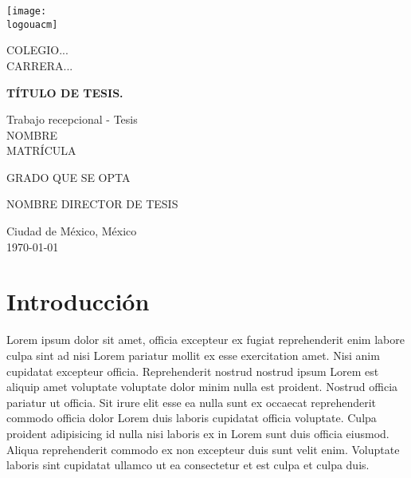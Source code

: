 \documentclass[12pt,twoside,left5mm,doublespacing]{bookest}
\newcommand{\logouacm}{logof.png} %
\begin{document}

\begin{titlepage}
	\centering

	\texttt{[image: \\logouacm]}
	\par\vspace{0.5cm}
	\large{COLEGIO...} \\
	\large{CARRERA...}
	\par\vspace{0.5cm}
	\Large\textbf{TÍTULO DE TESIS.} \\
	\par\vspace{0.5cm}
	\large{Trabajo recepcional - Tesis} \\
	\Large{NOMBRE} \\
	\large{MATRÍCULA}
	\par\vspace{0.5cm}
	\large{GRADO QUE SE OPTA} \\
	\par\vspace{0.5cm}
	\large{NOMBRE DIRECTOR DE TESIS}
	\par\vspace{0.5cm}
	\large{Ciudad de México, México} \\
	\large{\today}

\end{titlepage}



\thispagestyle{empty} %

\tableofcontents %

\clearpage %
\thispagestyle{empty} %



\frontmatter
\chapter{Introducción}

Lorem ipsum dolor sit amet, officia excepteur ex fugiat reprehenderit enim labore culpa sint ad nisi Lorem pariatur mollit ex esse exercitation amet. Nisi anim cupidatat excepteur officia. Reprehenderit nostrud nostrud ipsum Lorem est aliquip amet voluptate voluptate dolor minim nulla est proident. Nostrud officia pariatur ut officia. Sit irure elit esse ea nulla sunt ex occaecat reprehenderit commodo officia dolor Lorem duis laboris cupidatat officia voluptate. Culpa proident adipisicing id nulla nisi laboris ex in Lorem sunt duis officia eiusmod. Aliqua reprehenderit commodo ex non excepteur duis sunt velit enim. Voluptate laboris sint cupidatat ullamco ut ea consectetur et est culpa et culpa duis.
\end{document}
